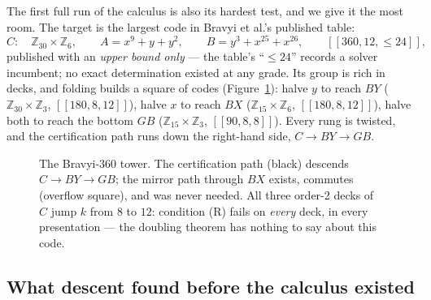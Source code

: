 \documentclass[11pt]{article}
\theoremstyle{plain}
\theoremstyle{definition}
\theoremstyle{remark}
\newcommand{\Z}{\mathbb{Z}}
\begin{document}
The first full run of the calculus is also its hardest test, and we give
it the most room. The target is the largest code in Bravyi et al.'s
published table:
\[
C: \quad \Z_{30} \times \Z_6, \qquad
A = x^9 + y + y^2, \qquad B = y^3 + x^{25} + x^{26}, \qquad
[[360, 12, {\leq}24]] ,
\]
published with an \emph{upper bound only} --- the table's ``$\leq 24$''
records a solver incumbent; no exact determination existed at any grade.
Its group is rich in decks, and folding builds a square of codes
(Figure~\ref{fig:bravyitower}): halve $y$ to reach $BY$
($\Z_{30}\times\Z_3$, $[[180,8,12]]$), halve $x$ to reach $BX$
($\Z_{15}\times\Z_6$, $[[180,8,12]]$), halve both to reach the bottom
$GB$ ($\Z_{15}\times\Z_3$, $[[90,8,8]]$). Every rung is twisted, and the
certification path runs down the right-hand side, $C \to BY \to GB$.

\begin{figure}[ht]
\centering
{}
\caption{The Bravyi-360 tower. The certification path (black) descends
$C \to BY \to GB$; the mirror path through $BX$ exists, commutes
(overflow square), and was never needed. All three order-2 decks of $C$
jump $k$ from $8$ to $12$: condition (R) fails on \emph{every} deck, in
every presentation --- the doubling theorem has nothing to say about this
code.}
\label{fig:bravyitower}
\end{figure}

\subsection{What descent found before the calculus existed}
\end{document}
